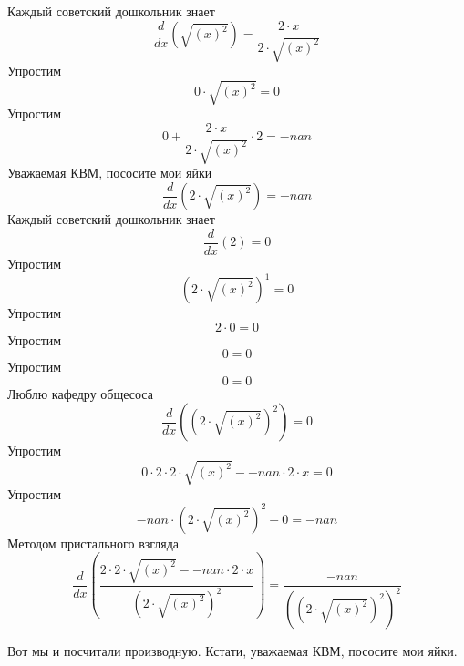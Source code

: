 \documentclass[12pt, a4paper]{article}
\begin{document}
Каждый советский дошкольник знает
\begin{equation}
\frac{d}{dx}(\sqrt{{(x)}^{2}}) = \frac{2 \cdot x}{2 \cdot \sqrt{{(x)}^{2}}}
\end{equation}
Упростим
\begin{equation}
0 \cdot \sqrt{{(x)}^{2}} = 0
\end{equation}
Упростим
\begin{equation}
0+\frac{2 \cdot x}{2 \cdot \sqrt{{(x)}^{2}}} \cdot 2 = -nan
\end{equation}
Уважаемая КВМ, пососите мои яйки
\begin{equation}
\frac{d}{dx}(2 \cdot \sqrt{{(x)}^{2}}) = -nan
\end{equation}
Каждый советский дошкольник знает
\begin{equation}
\frac{d}{dx}(2) = 0
\end{equation}
Упростим
\begin{equation}
{(2 \cdot \sqrt{{(x)}^{2}})}^{1} = 0
\end{equation}
Упростим
\begin{equation}
2 \cdot 0 = 0
\end{equation}
Упростим
\begin{equation}
0 = 0
\end{equation}
Упростим
\begin{equation}
0 = 0
\end{equation}
Люблю кафедру общесоса
\begin{equation}
\frac{d}{dx}({(2 \cdot \sqrt{{(x)}^{2}})}^{2}) = 0
\end{equation}
Упростим
\begin{equation}
0 \cdot 2 \cdot 2 \cdot \sqrt{{(x)}^{2}}--nan \cdot 2 \cdot x = 0
\end{equation}
Упростим
\begin{equation}
-nan \cdot {(2 \cdot \sqrt{{(x)}^{2}})}^{2}-0 = -nan
\end{equation}
Методом пристального взгляда
\begin{equation}
\frac{d}{dx}(\frac{2 \cdot 2 \cdot \sqrt{{(x)}^{2}}--nan \cdot 2 \cdot x}{{(2 \cdot \sqrt{{(x)}^{2}})}^{2}}) = \frac{-nan}{{({(2 \cdot \sqrt{{(x)}^{2}})}^{2})}^{2}}
\end{equation}


Вот мы и посчитали производную. Кстати, уважаемая КВМ, пососите мои яйки.
\end{document}
